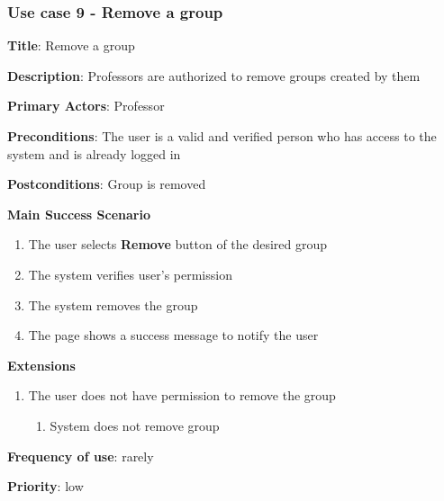 \documentclass[singlespacing,12pt,parskip,headsepline,consistentlayout]{article}
\begin{document}
\pagebreak
\subsubsection{Use case 9 - Remove a group}
\begin{flushleft}
\vspace{0.2cm}
\hline
\vspace{0.2cm}
{\bfseries Title}: {Remove a group}

{\bfseries Description}: {Professors are authorized to remove groups created by them}

{\bfseries Primary Actors}: {Professor}

{\bfseries Preconditions}: The user is a valid and verified person who has access to the system and is already logged in

{\bfseries Postconditions}: {Group is removed}

{\bfseries Main Success Scenario}

\begin{enumerate}
      \item The user selects {\bfseries Remove} button of the desired group
      \item The system verifies user’s permission
      \item The system removes the group
      \item The page shows a success message to notify the user
\end{enumerate}
 
{\bfseries Extensions}

\begin{enumerate}
  \item The user does not have permission to remove the group
  \begin{enumerate}
      \item System does not remove group
  \end{enumerate}
\end{enumerate}

{\bfseries Frequency of use}: rarely

{\bfseries Priority}: low

\end{flushleft}

\pagebreak
\end{document}
